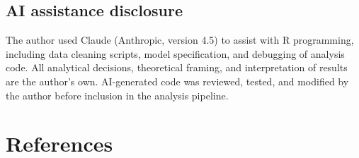 \documentclass[
  12pt,
  letterpaper]{article}
\begin{document}
\newpage

\subsection*{AI assistance disclosure}\label{ai-assistance-disclosure}

The author used Claude (Anthropic, version 4.5) to assist with R
programming, including data cleaning scripts, model specification, and
debugging of analysis code. All analytical decisions, theoretical
framing, and interpretation of results are the author's own.
AI-generated code was reviewed, tested, and modified by the author
before inclusion in the analysis pipeline.

\section*{References}\label{references}
\end{document}
